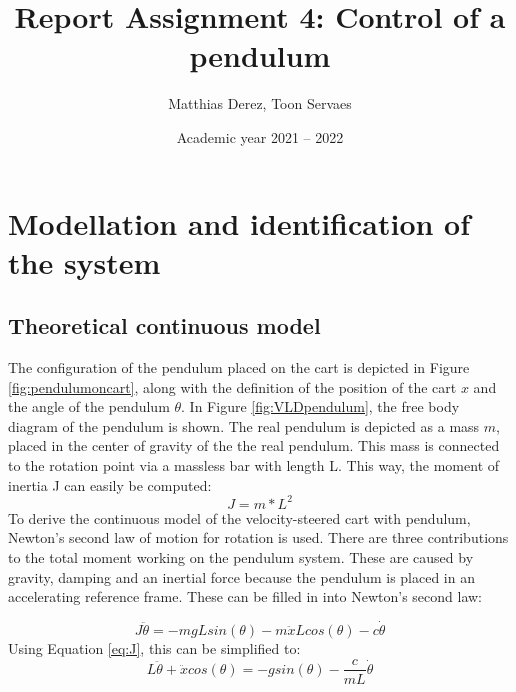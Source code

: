 \documentclass[a4paper,kul]{kulakarticle} %
\date{Academic year 2021 -- 2022}
\title{Report Assignment 4: Control of a pendulum}
\author{Matthias Derez, Toon Servaes}
\begin{document}
\maketitle

\tableofcontents
\listoffigures
\listoftables

\section{Modellation and identification of the system}
\subsection{Theoretical continuous model}
The configuration of the pendulum placed on the cart is depicted in Figure \ref{fig:pendulumoncart}, along with the definition of the position of the cart $x$ and the angle of the pendulum $\theta$. In Figure \ref{fig:VLDpendulum}, the free body diagram of the pendulum is shown. The real pendulum is depicted as a mass $m$, placed in the center of gravity of the the real pendulum. This mass is connected to the rotation point via a massless bar with length L. This way, the moment of inertia J can easily be computed: 
\begin{equation}
	J = m*L^2
	\label{eq:J}
\end{equation}
To derive the continuous model of the velocity-steered cart with pendulum, Newton's second law of motion for rotation is used. There are three contributions to the total moment working on the pendulum system. These are caused by gravity, damping and an inertial force because the pendulum is placed in an accelerating reference frame. These can be filled in into Newton's second law:

\begin{equation}
	J\ddot{\theta}=-mgLsin(\theta) - m\ddot{x}Lcos(\theta) - c\dot{\theta}
\end{equation}
Using Equation \ref{eq:J}, this can be simplified to:
\begin{equation}
	L\ddot{\theta}+\ddot{x}cos(\theta) = -gsin(\theta) - \frac{c}{mL}\dot{\theta}
	\label{eq:newton}
\end{equation}
\end{document}
